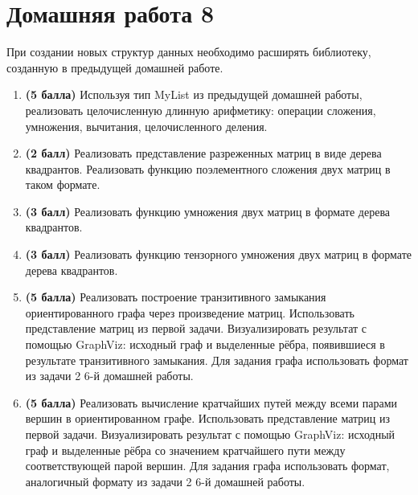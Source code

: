 \section{Домашняя работа 8}

При создании новых структур данных необходимо расширять библиотеку, созданную в предыдущей домашней работе.

\begin{enumerate}

    \item \textbf{(5 балла)} Используя тип MyList из предыдущей домашней работы, реализовать целочисленную длинную арифметику: операции сложения, умножения, вычитания, целочисленного деления. 

    \item \textbf{(2 балл)} Реализовать представление разреженных матриц в виде дерева квадрантов. Реализовать функцию поэлементного сложения двух матриц в таком формате.
    
    \item \textbf{(3 балл)} Реализовать функцию умножения двух матриц в формате дерева квадрантов.
    
    \item \textbf{(3 балл)} Реализовать функцию тензорного умножения двух матриц в формате дерева квадрантов.
    
    \item \textbf{(5 балла)} Реализовать построение транзитивного замыкания ориентированного графа через произведение матриц. Использовать представление матриц из первой задачи. Визуализировать результат с помощью GraphViz: исходный граф и выделенные рёбра, появившиеся в результате транзитивного замыкания. Для задания графа использовать формат из задачи 2 6-й домашней работы.
    
    \item \textbf{(5 балла)} Реализовать вычисление кратчайших путей между всеми парами вершин в ориентированном графе. Использовать представление матриц из первой задачи. Визуализировать результат с помощью GraphViz: исходный граф и выделенные рёбра со значением кратчайшего пути между соответствующей парой вершин. Для задания графа использовать формат, аналогичный формату из задачи 2 6-й домашней работы.
\end{enumerate}